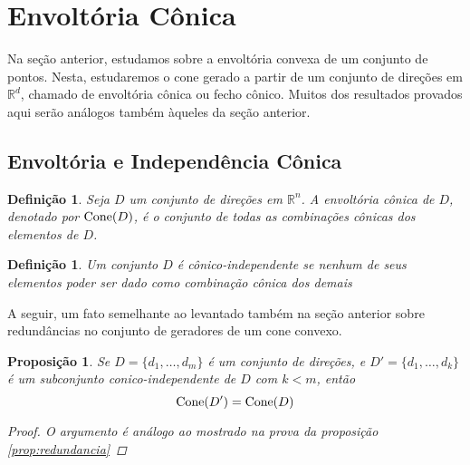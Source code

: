 \newtheorem{def:envoltoria conica}[def:conjunto convexo]{Definição}
\newtheorem{def:independencia conica}[def:conjunto convexo]{Definição}

\newtheorem{prop:redundancia conica}[prop:combinação convexa]{Proposição}

\newtheorem{thm:caratheodory cones}[thm:caratheodory]{Teorema}

\newtheorem{cor:caratheodory cones}[cor:caratheodory]{Corolário}

\section{Envoltória Cônica}

Na seção anterior, estudamos sobre a envoltória convexa de um conjunto de
pontos. Nesta, estudaremos o cone gerado a partir de um conjunto de direções
em $\mathbb{R}^d$, chamado de envoltória cônica ou fecho cônico. Muitos dos
resultados provados aqui serão análogos também àqueles da seção anterior.

\subsection{Envoltória e Independência Cônica}

\begin{def:envoltoria conica}
  Seja $D$ um conjunto de direções em $\mathbb{R}^n$. A envoltória cônica de
  $D$, denotado por $\mathrm{Cone}(D)$, é o conjunto de todas as combinações cônicas
  dos elementos de $D$.
\end{def:envoltoria conica}

\begin{def:independencia conica}
 Um conjunto $D$ é cônico-independente se nenhum de seus elementos poder ser
 dado como combinação cônica dos demais
\end{def:independencia conica}

A seguir, um fato semelhante ao levantado também na seção anterior sobre
redundâncias no conjunto de geradores de um cone convexo.
\begin{prop:redundancia conica}
  Se $D = \{d_1, \dots, d_m\}$ é um conjunto de direções, e
  $D' = \{d_1, \dots, d_k\}$ é um subconjunto conico-independente
  de $D$ com $k < m$, então
  \[
    \mathrm{Cone}(D') = \mathrm{Cone}(D)
  \]
  \begin{proof}
    O argumento é análogo ao mostrado na prova da proposição \ref{prop:redundancia}
  \end{proof}
\end{prop:redundancia conica}

